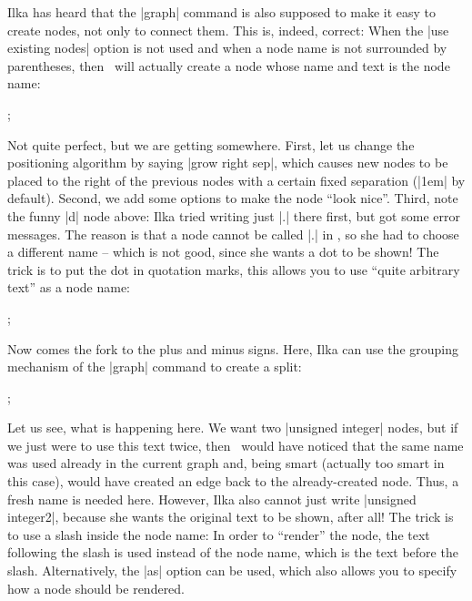 Ilka has heard that the |graph| command is also supposed to make it easy to
create nodes, not only to connect them. This is, indeed, correct: When the
|use existing nodes| option is not used and when a node name is not surrounded
by parentheses, then \tikzname\ will actually create a node whose name and text
is the node name:
%
\begin{codeexample}[libraries/tikz={graphs}]
\tikz {};
\end{codeexample}
%
Not quite perfect, but we are getting somewhere. First, let us change the
positioning algorithm by saying |grow right sep|, which causes new nodes to be
placed to the right of the previous nodes with a certain fixed separation
(|1em| by default). Second, we add some options to make the node ``look nice''.
Third, note the funny |d| node above: Ilka tried writing just |.| there first,
but got some error messages. The reason is that a node cannot be called |.| in
\tikzname, so she had to choose a different name -- which is not good, since
she wants a dot to be shown! The trick is to put the dot in quotation marks,
this allows you to use ``quite arbitrary text'' as a node name:

\begin{codeexample}[libraries/tikz={graphs,shapes.misc}]
\tikz {};
\end{codeexample}
%
Now comes the fork to the plus and minus signs. Here, Ilka can use the grouping
mechanism of the |graph| command to create a split:
%
\begin{codeexample}[libraries/tikz={graphs,shapes.misc}]
\tikz {};
\end{codeexample}
%
Let us see, what is happening here. We want two |unsigned integer| nodes, but
if we just were to use this text twice, then \tikzname\ would have noticed that
the same name was used already in the current graph and, being smart (actually
too smart in this case), would have created an edge back to the already-created
node. Thus, a fresh name is needed here. However, Ilka also cannot just write
|unsigned integer2|, because she wants the original text to be shown, after
all! The trick is to use a slash inside the node name: In order to ``render''
the node, the text following the slash is used instead of the node name, which
is the text before the slash. Alternatively, the |as| option can be used, which
also allows you to specify how a node should be rendered.

